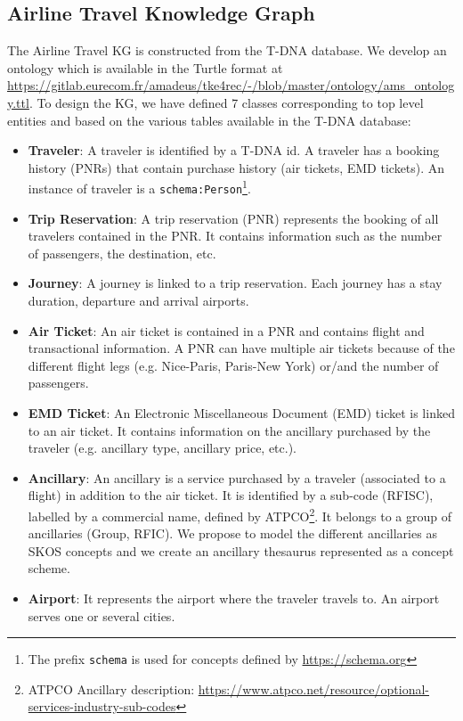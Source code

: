 \documentclass[11pt,dvipdfm]{article}
\begin{document}
\subsection{Airline Travel Knowledge Graph}
\label{subsec:kg}
The Airline Travel KG is constructed from the T-DNA database. We develop an ontology which is available in the Turtle format at \url{https://gitlab.eurecom.fr/amadeus/tke4rec/-/blob/master/ontology/ams_ontology.ttl}. To design the KG, we have defined 7 classes corresponding to top level entities and based on the various tables available in the T-DNA database:
\begin{itemize}
    \item \textbf{Traveler}: A traveler is identified by a T-DNA id. A traveler has a booking history (PNRs) that contain purchase history (air tickets, EMD tickets). An instance of traveler is a \texttt{schema:Person}\footnote{The prefix \texttt{schema} is used for concepts defined by \url{https://schema.org}}.
    \item \textbf{Trip Reservation}: A trip reservation (PNR) represents the booking of all travelers contained in the PNR. It contains information such as the number of passengers, the destination, etc.
    \item \textbf{Journey}: A journey is linked to a trip reservation. Each journey has a stay duration, departure and arrival airports.
    \item \textbf{Air Ticket}: An air ticket is contained in a PNR and contains flight and transactional information. A PNR can have multiple air tickets because of the different flight legs (e.g. Nice-Paris, Paris-New York) or/and the number of passengers.
    \item \textbf{EMD Ticket}: An Electronic Miscellaneous Document (EMD) ticket is linked to an air ticket. It contains information on the ancillary purchased by the traveler (e.g. ancillary type, ancillary price, etc.).
    \item \textbf{Ancillary}: An ancillary is a service purchased by a traveler (associated to a flight) in addition to the air ticket. It is identified by a sub-code (RFISC), labelled by a commercial name, defined by ATPCO\footnote{ATPCO Ancillary description: \url{https://www.atpco.net/resource/optional-services-industry-sub-codes}}. It  belongs to a group of ancillaries (Group, RFIC). We propose to model the different ancillaries as SKOS concepts and we create an ancillary thesaurus represented as a concept scheme.
    \item \textbf{Airport}: It represents the airport where the traveler travels to. An airport serves one or several cities.
\end{itemize}
\end{document}
